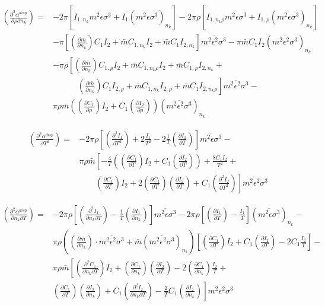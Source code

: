 \documentclass[english]{../thermomemo/thermomemo}
\newcommand*{\pder}[2]{\left(\frac{\partial #1}{\partial #2}\right)}
\newcommand*{\pdder}[2]{\left(\frac{\partial^2 #1}{\partial #2^2}\right)}
\newcommand*{\pdcross}[3]{\left(\frac{\partial^2 #1}{\partial #2 \partial #3}\right)}
\newcommand{\lp}{\left(}
\newcommand{\rp}{\right)}
\begin{document}
\begin{equation}
  \begin{aligned}
    \pdcross{\alpha^{disp}}{\rho}{n_k} =& -2 \pi \left[ I_{1,n_k} \overline{m^2 \epsilon \sigma^3} + I_1 (\overline{m^2 \epsilon \sigma^3})_{n_k} \right] -2 \pi \rho \left[ I_{1,n_k \rho} \overline{m^2 \epsilon \sigma^3} + I_{1,\rho} (\overline{m^2 \epsilon \sigma^3})_{n_k} \right] \\
    &- \pi \left[ \pder{\bar m}{n_k} C_1 I_2 + \bar m C_{1,n_k} I_2 + \bar m C_1 I_{2,n_k} \right] \overline{m^2 \epsilon^2 \sigma^3} - \pi \bar m C_1 I_2 (\overline{m^2 \epsilon^2 \sigma^3})_{n_k} \\
    &- \pi \rho \left[ \pder{\bar m}{n_k} C_{1,\rho} I_2 + \bar m C_{1,n_k \rho} I_2 + \bar m C_{1,\rho} I_{2,n_k} + \right. \\
    & \qquad \quad  \left. \pder{\bar m}{n_k} C_1 I_{2,\rho} + \bar m C_{1,n_k} I_{2,\rho} + \bar m C_1 I_{2,n_k \rho} \right] \overline{m^2 \epsilon^2 \sigma^3} - \\
    & \pi \rho \bar m \lp \pder{C_1}{\rho} I_2 + C_1 \pder{I_2}{\rho} \rp (\overline{m^2 \epsilon^2 \sigma^3})_{n_k}
  \end{aligned}
\end{equation}


\begin{equation}
  \begin{aligned}
    \pdder{\alpha^{disp}}{T} =& -2 \pi \rho \left[ \pdder{I_1}{T} + 2 \frac{I_1}{T^2} - 2 \frac{1}{T} \pder{I_1}{T} \right] \overline{m^2 \epsilon \sigma^3} -  \\
    & \pi \rho \bar m \left[ -\frac{4}{T} \lp \pder{C_1}{T} I_2 + C_1 \pder{I_2}{T} \rp + \frac{8 C_1 I_2}{T^2} +\right. \\
    & \qquad \left. \pder{C_1}{T} I_2 + 2 \pder{C_1}{T} \pder{I_2}{T} + C_1 \pdder{I_2}{T} \right] \overline{m^2 \epsilon^2 \sigma^3}
  \end{aligned}
\end{equation}

\begin{equation}
  \begin{aligned}
    \pdcross{\alpha^{disp}}{n_k}{T} =& -2 \pi \rho \left[ \pdcross{I_1}{n_k}{T} - \frac{1}{T} \pder{I_1}{n_k} \right] \overline{m^2 \epsilon \sigma^3} -2 \pi \rho \left[ \pder{I_1}{T} - \frac{I_1}{T} \right] (\overline{m^2 \epsilon \sigma^3})_{n_k} - \\
    & \pi \rho \lp \pder{\bar m}{n_k} \cdot \overline{m^2 \epsilon^2 \sigma^3} + \bar m (\overline{m^2 \epsilon^2 \sigma^3})_{n_k} \rp \left[ \pder{C_1}{T} I_2 + C_1 \pder{I_2}{T} - 2 C_1 \frac{I_2}{T}\right] -\\
    & \pi \rho \bar m \left[ \pdcross{C_1}{n_k}{T} I_2 + \pder{C_1}{n_k} \pder{I_2}{T} - 2 \pder{C_1}{n_k} \frac{I_2}{T} + \right. \\
    & \left. \pder{C_1}{T} \pder{I_2}{n_k} + C_1 \pdcross{I_2}{n_k}{T} - \frac{2}{T} C_1 \pder{I_2}{n_k} \right] \overline{m^2 \epsilon^2 \sigma^3}
  \end{aligned}
\end{equation}
\end{document}
